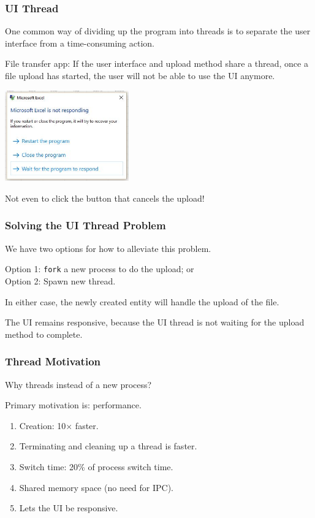 \begin{frame}
	\frametitle{UI Thread}

	One common way of dividing up the program into threads is to separate the user interface from a time-consuming action.


	File transfer app: If the user interface and upload method share a thread, once a file upload has started, the user will not be able to use the UI anymore.
	
	\begin{center}
	\includegraphics[width=0.4\textwidth]{images/notresponding.png}
	\end{center}

	Not even to click the button that cancels the upload!

\end{frame}

\begin{frame}
	\frametitle{Solving the UI Thread Problem}

	We have two options for how to alleviate this problem.

	Option 1: \texttt{fork} a new process to do the upload; or \\
	Option 2: Spawn  new thread.

	In either case, the newly created entity will handle the upload of the file.

	The UI remains responsive, because the UI thread is not waiting for the upload method to complete.

\end{frame}

\begin{frame}
	\frametitle{Thread Motivation}
	Why threads instead of a new process?

	Primary motivation is: performance.

	\begin{enumerate}
		\item Creation: 10$\times$ faster.
		\item Terminating and cleaning up a thread is faster.
		\item Switch time: 20\% of process switch time.
		\item Shared memory space (no need for IPC).
		\item Lets the UI be responsive.
	\end{enumerate}

\end{frame}

